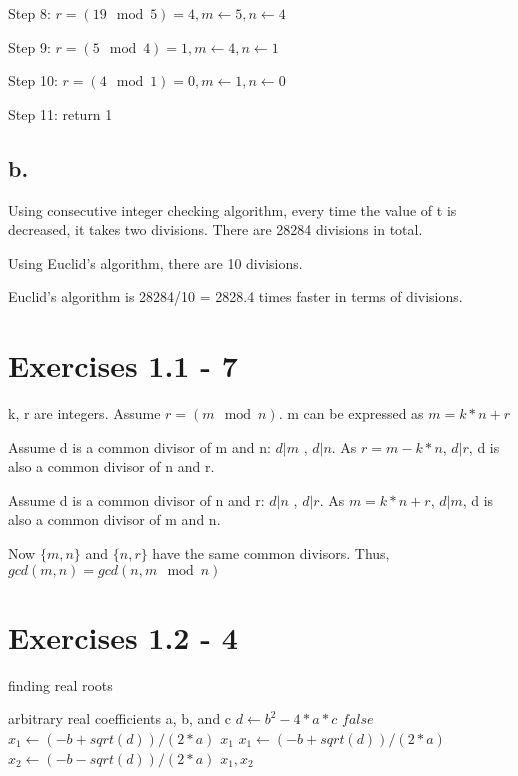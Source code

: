 \documentclass{article}
\begin{document}
Step 8: $r = (19 \mod 5) = 4, m \leftarrow 5, n \leftarrow 4 $

Step 9: $r = (5 \mod 4) = 1, m \leftarrow 4, n \leftarrow 1 $

Step 10: $r = (4 \mod 1) = 0, m \leftarrow 1, n \leftarrow 0 $

Step 11: return 1

\subsection*{b.}

Using consecutive integer checking algorithm, every time the value of t is decreased, it takes two divisions. There are 28284 divisions in total.

Using Euclid's algorithm, there are 10 divisions.

Euclid's algorithm is 28284/10 = 2828.4 times faster in terms of divisions.

\section{Exercises 1.1 - 7}

k, r are integers. Assume $ r= (m \mod n)$. m can be expressed as $m = k*n +r$

Assume d is a common divisor of m and n: $d |m$ , $d|n$. As $r = m - k*n$, $d | r$, d is also a common divisor of n and r.

Assume d is a common divisor of n and r: $d |n$ , $d|r$. As $m = k*n +r $, $d | m$, d is also a common divisor of m and n.

Now $\{m,n\}$ and $\{n,r\}$ have the same common divisors. Thus, $gcd(m,n) = gcd(n, m \mod n)$

\section{Exercises 1.2 - 4}

\begin{algorithm}
\caption{finding real roots}
\begin{algorithmic}[1]
\INPUT arbitrary real coefficients a, b, and c
\State $ d \leftarrow b^2-4*a*c  $
\State \Return $false$
\State $ x_1 \leftarrow (-b + sqrt(d))/(2*a)$
\State \Return $x_1$
\State $x_1 \leftarrow (-b + sqrt(d))/(2*a)$
\State $x_2 \leftarrow (-b - sqrt(d))/(2*a)$
\State \Return $ x_1, x_2$
\EndIf
\end{algorithmic}
\end{algorithm}
\end{document}
